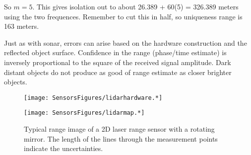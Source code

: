 So \(m=5\). This gives isolation out to about 26.389 + 60(5) = 326.389
meters using the two frequences. Remember to cut this in half, so
uniqueness range is 163 meters.

Just as with sonar, errors can arise based on the hardware construction
and the reflected object surface. Confidence in the range (phase/time
estimate) is inversely proportional to the square of the received signal
amplitude. Dark distant objects do not produce as good of range estimate
as closer brighter objects.

\begin{figure}
\centering
\texttt{[image: SensorsFigures/lidarhardware.*]}
\caption{}
\end{figure}

\begin{figure}
\centering
\texttt{[image: SensorsFigures/lidarmap.*]}
\caption{Typical range image of a 2D laser range sensor with a rotating
mirror. The length of the lines through the measurement points indicate
the uncertainties.}
\end{figure}

